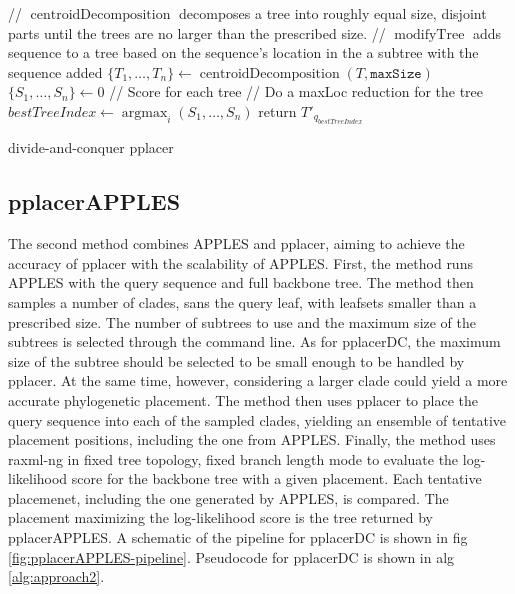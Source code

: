 \documentclass[10pt]{article}
\begin{document}
\begin{algorithm}[!htb]
\SetAlgoLined
{}
 // $\operatorname{centroidDecomposition}$ decomposes a tree into roughly equal size, disjoint parts until the trees are no larger than the prescribed size.\;
 // $\operatorname{modifyTree}$ adds sequence to a tree based on the sequence's location in the a subtree with the sequence added\;
 $\{T_1,\dots,T_n\} \leftarrow \operatorname{centroidDecomposition}(T,\texttt{maxSize})$\;
 $\{S_1, \dots, S_n\} \leftarrow 0$ // Score for each tree\;
 // Do a maxLoc reduction for the tree\;
 $bestTreeIndex \leftarrow \operatorname{argmax}_{i} (S_1,\dots,S_n)$\;
 return $T'_{q_{bestTreeIndex}}$\;
 \caption{divide-and-conquer pplacer}
 \label{alg:approach1}
\end{algorithm}

\subsection{pplacerAPPLES}

The second method combines APPLES and pplacer, aiming to achieve the accuracy of pplacer with the scalability of APPLES.
First, the method runs APPLES with the query sequence and full backbone tree.
The method then samples a number of clades, sans the query leaf, with leafsets smaller
than a prescribed size.
The number of subtrees to use and the maximum size of the subtrees is selected through the command line.
As for pplacerDC, the maximum size of the subtree should be selected to be small enough to be handled by pplacer.
At the same time, however, considering a larger clade could yield a more accurate phylogenetic placement.
The method then uses pplacer to place the query sequence into each of the sampled clades, yielding
an ensemble of tentative placement positions, including the one from APPLES.
Finally, the method uses raxml-ng in fixed tree topology, fixed branch length mode to evaluate
the log-likelihood score for the backbone tree with a given placement.
Each tentative placemenet, including the one generated by APPLES, is compared.
The placement maximizing the log-likelihood score is the tree returned by pplacerAPPLES.
A schematic of the pipeline for pplacerDC is shown in fig \ref{fig:pplacerAPPLES-pipeline}.
Pseudocode for pplacerDC is shown in alg \ref{alg:approach2}.
\end{document}
